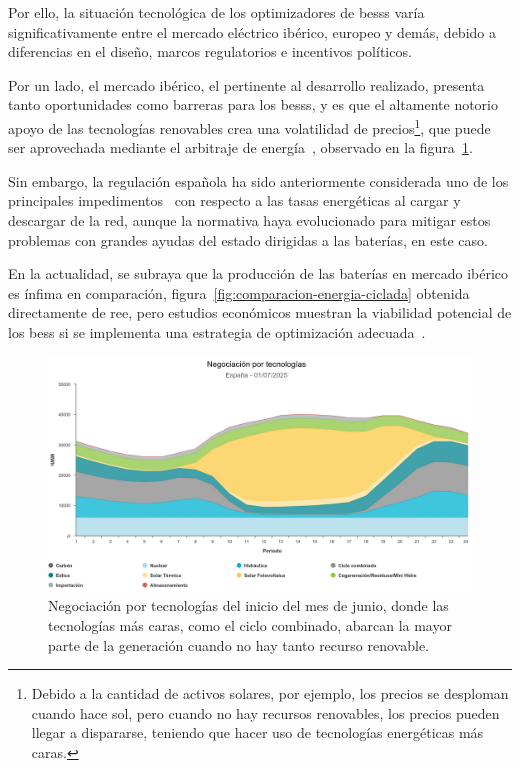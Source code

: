 Por ello, la situación tecnológica de los optimizadores de \glspl{bess} varía significativamente entre el mercado eléctrico ibérico, europeo y demás, debido a diferencias en el diseño, marcos regulatorios e incentivos políticos.

Por un lado, el mercado ibérico, el pertinente al desarrollo realizado, presenta tanto oportunidades como barreras para los \glspl{bess}, y es que el altamente notorio apoyo de las tecnologías renovables crea una volatilidad de precios\footnote{Debido a la cantidad de activos solares, por ejemplo, los precios se desploman cuando hace sol, pero cuando no hay recursos renovables, los precios pueden llegar a dispararse, teniendo que hacer uso de tecnologías energéticas más caras.}, que puede ser aprovechada mediante el arbitraje de energía~\cite{hu2022potential}, observado en la figura~\ref{fig:arbitraje-tecnologia}.

Sin embargo, la regulación española ha sido anteriormente considerada uno de los principales impedimentos~\cite{hu2021barriers} con respecto a las tasas energéticas al cargar y descargar de la red, aunque la normativa haya evolucionado para mitigar estos problemas con grandes ayudas del estado dirigidas a las baterías, en este caso.

En la actualidad, se subraya que la producción de las baterías en mercado ibérico es ínfima en comparación, figura~\ref{fig:comparacion-energia-ciclada} obtenida directamente de \gls{ree}, pero estudios económicos muestran la viabilidad potencial de los \gls{bess} si se implementa una estrategia de optimización adecuada~\cite{he2015optimal}.

\begin{figure}
  \centering
  \includegraphics[width=0.75\linewidth]{figures/arbitraje-tecnologia.jpg}
  \caption[Negociación por tecnologías.]{Negociación por tecnologías del inicio del mes de junio, donde las tecnologías más caras, como el ciclo combinado, abarcan la mayor parte de la generación cuando no hay tanto recurso renovable.}%
  \label{fig:arbitraje-tecnologia}
\end{figure}

